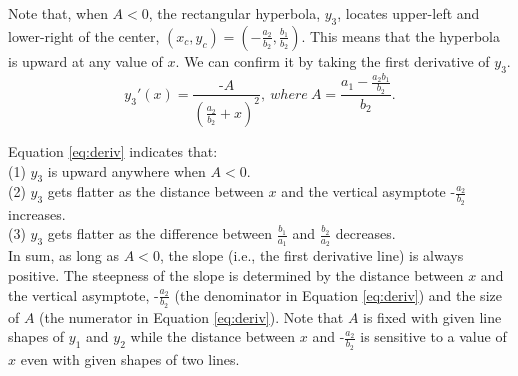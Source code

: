 \documentclass[11pt, a4paper]{article}
\begin{document}
\noindent
Note that, when $A<0$, the rectangular hyperbola, $y_3$, locates upper-left and lower-right of the center, $(x_c, y_c) = (-\frac{a_2}{b_2}, \frac{b_1}{b_2})$. This means that the hyperbola is upward at any value of $x$. We can confirm it by  taking the first derivative of $y_3$.\\


\noindent
\begin{equation}
\label{eq:deriv}
y_3'(x)=\frac{\mbox{-}A}{(\frac{a_2}{b_2}+x)^2},~where~A = \frac{a_1-\frac{a_2 b_1}{b_2}}{b_2}.
\end{equation}

\noindent
Equation \ref{eq:deriv} indicates that:\\ 
(1) $y_3$ is upward anywhere when $A<0$.\\
(2) $y_3$ gets flatter as the distance between $x$ and the vertical asymptote $\mbox{-}\frac{a_2}{b_2}$ increases.\\
(3) $y_3$ gets flatter as the difference between $\frac{b_1}{a_1}$ and $\frac{b_2}{a_2}$ decreases.\\%

\noindent
In sum, as long as $A<0$, the slope (i.e., the first derivative line) is always positive. The steepness of the slope is determined by the distance between $x$ and the vertical asymptote, $\mbox{-}\frac{a_2}{b_2}$ (the denominator in Equation \ref{eq:deriv}) and the size of $A$ (the numerator in Equation \ref{eq:deriv}). Note that $A$ is fixed with given line shapes of $y_1$ and $y_2$ while the distance between $x$ and $\mbox{-}\frac{a_2}{b_2}$ is sensitive to a value of $x$ even with given shapes of two lines.\\
\end{document}
